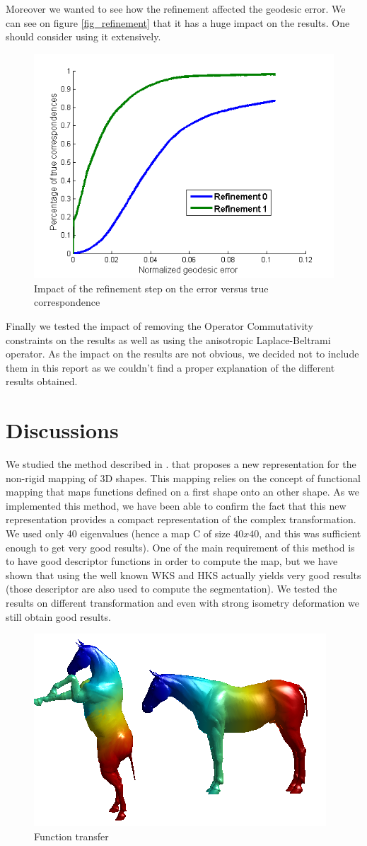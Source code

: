 \documentclass[10pt,twocolumn,letterpaper]{article}
\begin{document}
Moreover we wanted to see how the refinement affected the geodesic error. We can see on figure \ref{fig_refinement} that it has a huge impact on the results. One should consider using it extensively.

\begin{figure}[h]
\centering
\includegraphics[width=.4\textwidth]{Images/refinement.png}
\caption{Impact of the refinement step on the error versus true correspondence}
\label{refinement}
\end{figure}

Finally we tested the impact of removing the Operator Commutativity constraints on the results as well as using the anisotropic Laplace-Beltrami operator. As the impact on the results are not obvious, we decided not to include them in this report as we couldn't find a proper explanation of the different results obtained.
 

\section{Discussions} %
We studied the method described in \cite{ovs}. that proposes a new representation for the non-rigid mapping of 3D shapes. This mapping relies on the concept of functional mapping that maps functions defined on a first shape onto an other shape. As we implemented this method, we have been able to confirm the fact that this new representation provides a compact representation of the complex transformation. We used only 40 eigenvalues (hence a map C of size $40x40$, and this was sufficient enough to get very good results). One of the main requirement of this method is to have good descriptor functions in order to compute the map, but we have shown that using the well known WKS and HKS actually yields very good results (those descriptor are also used to compute the segmentation). We tested the results on different transformation and even with strong isometry deformation we still obtain good results.

\begin{figure}[h]
\centering
\includegraphics[width=.3\textwidth]{Images/full-constraints-iso1-3segments-horse.png}
\caption{Function transfer}
\label{refinement}
\end{figure}
\end{document}
